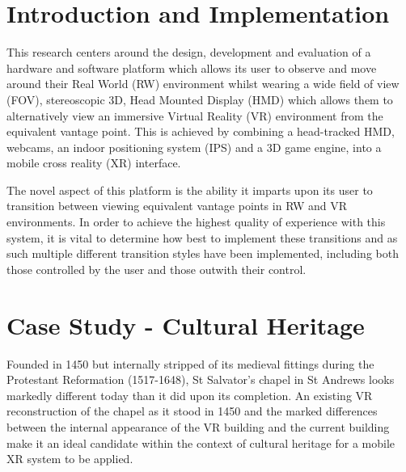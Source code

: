 \documentclass[tog]{acmsiggraph}
\begin{document}

\keywordlist


\TOGlinkslist


\copyrightspace


\section{Introduction and Implementation}

This research centers around the design, development and evaluation
of a hardware and software platform which allows its user to observe
and move around their Real World (RW) environment whilst wearing a wide field of view (FOV), stereoscopic 3D, Head Mounted
Display (HMD) which allows them to alternatively view an immersive Virtual Reality (VR) environment from the equivalent vantage
point. This is achieved by combining a head-tracked HMD, webcams, an indoor positioning system (IPS) and a 3D game engine, into
a mobile cross reality (XR) interface.

The novel aspect of this platform is the ability it imparts upon its user to transition between viewing equivalent vantage points in RW and VR environments. In order to achieve the highest quality of experience with this system, it is vital to determine how best to implement these transitions and as such multiple different transition styles have been implemented, including both those controlled by the user and those outwith their control.


\section{Case Study - Cultural Heritage}
Founded in 1450 but internally stripped of its medieval fittings during the Protestant Reformation (1517-1648), St Salvator's chapel in St Andrews looks markedly different today than it did upon its completion. An existing VR reconstruction of the chapel as it stood in 1450 and the marked differences between the internal appearance of the VR building and the current building make it an ideal candidate within the context of cultural heritage for a mobile XR system to be applied.
\end{document}
